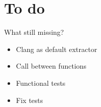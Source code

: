 \section{To do} %
\label{sec:analizo}

\begin{frame}{What still missing?}
    \begin{itemize} 
        \item Clang as default extractor
        \item Call between functions   
        \item Functional tests
        \item Fix tests
    \end{itemize}
\end{frame}
